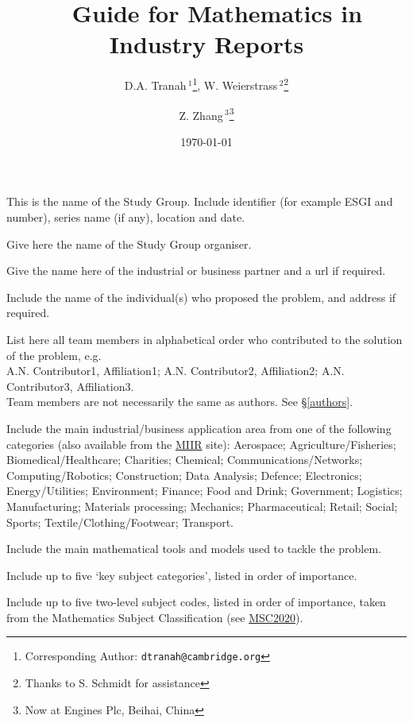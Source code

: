 \documentclass{MIIR}
\title[Guide for Mathematics in Industry Reports]{\LaTeXe\ %
         Guide for Mathematics in Industry Reports}
\author[Tranah et al.]{%
  D.A. Tranah$\,^1$\thanks{Corresponding Author: {\tt dtranah@cambridge.org}},\ls
  W. Weierstrass$\,^2$\thanks{Thanks to S. Schmidt for assistance}\ls
\and
  Z. Zhang$\,^3$\thanks{Now at Engines Plc, Beihai, China}
}
\affiliation{%
  $^1\,$Cambridge University Press, Cambridge, UK\\
    $^2\,$University of Harford, Harford, USA\\
  $^3\,$Allgemeine Industrials, Frankburg, Germany}
\date{\today}
\theoremstyle{plain}
\theoremstyle{definition}
\begin{document}
\label{firstpage}
\maketitle

\begin{footnotesize}

\begin{studygroup}
This is the name of the Study Group. Include identifier (for example ESGI and number), series name (if any), location and date.
\end{studygroup}

\begin{communicated}
Give here the name of the Study Group organiser.
\end{communicated}

\begin{partner}
Give the name here of the industrial or business partner and a url if required.
\end{partner}

\begin{presenter}
Include the name of the individual(s) who proposed the problem, and address if required.
\end{presenter}


\begin{team}
List here all team members in alphabetical order who contributed to the solution of the problem, e.g.\\
A.N. Contributor1, Affiliation1;
A.N. Contributor2, Affiliation2;
A.N. Contributor3, Affiliation3.\\
Team members are not necessarily the same as authors. See \S\ref{authors}.
\end{team}

\begin{application}
Include the main industrial/business application area from one of the following categories (also available from the \href{https://www.cambridge.org/engage/miir/public-dashboard}{MIIR} site):
Aerospace;
Agriculture/Fisheries;
Biomedical/Healthcare;
Charities;
Chemical;
Communications/Networks;
Computing/Robotics;
Construction;
Data Analysis;
Defence;
Electronics;
Energy/Utilities;
Environment;
Finance;
Food and Drink;
Government;
Logistics;
Manufacturing;
Materials processing;
Mechanics;
Pharmaceutical;
Retail;
Social;
Sports;
Textile/Clothing/Footwear;
Transport.
\end{application}

\begin{tools}
Include the main mathematical tools and models used to tackle the problem.
\end{tools}


\begin{keywords}
Include up to five `key subject categories', listed in order of importance.
\end{keywords}


\begin{MSC2020}
Include up to five two-level subject codes, listed in order of importance, taken from the Mathematics Subject Classification
(see \href{https://mathscinet.ams.org/msnhtml/msc2020.pdf}{MSC2020}).
\end{MSC2020}
\end{footnotesize}
\end{document}

